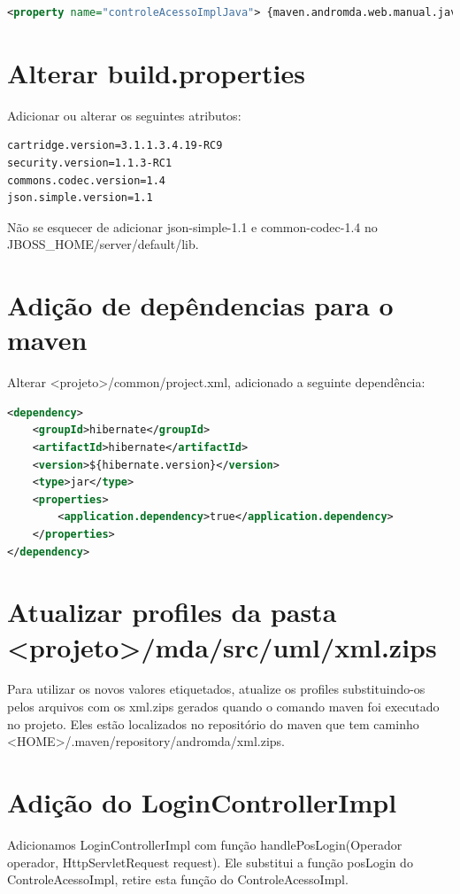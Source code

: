 \begin{framed}
\begin{lstlisting}[language=xml]
<property name="controleAcessoImplJava"> {maven.andromda.web.manual.java.dir}</property>
\end{lstlisting}
\end{framed}

\section{Alterar build.properties}
Adicionar ou alterar os seguintes atributos:

\begin{framed}
\begin{lstlisting}[language=xml]
cartridge.version=3.1.1.3.4.19-RC9
security.version=1.1.3-RC1
commons.codec.version=1.4
json.simple.version=1.1
\end{lstlisting}
\end{framed}

Não se esquecer de adicionar json-simple-1.1 e common-codec-1.4 no
\textdollar{}JBOSS\_HOME/server/default/lib.

\section{Adição de depêndencias para o maven}
Alterar <projeto>/common/project.xml, adicionado a seguinte dependência:

\begin{framed}
\begin{lstlisting}[language=xml]
<dependency>
	<groupId>hibernate</groupId>
	<artifactId>hibernate</artifactId>
	<version>${hibernate.version}</version>
	<type>jar</type>
	<properties>
		<application.dependency>true</application.dependency>
	</properties>
</dependency>
\end{lstlisting}
\end{framed}

\section{Atualizar profiles da pasta <projeto>/mda/src/uml/xml.zips}
Para utilizar os novos valores etiquetados, atualize os profiles substituindo-os
pelos arquivos com os xml.zips gerados quando o comando maven foi executado no projeto. Eles estão localizados no repositório do maven que tem caminho <HOME>/.maven/repository/andromda/xml.zips.

\section{Adição do LoginControllerImpl}
Adicionamos LoginControllerImpl com função handlePosLogin(Operador operador,
HttpServletRequest request). Ele substitui a função posLogin do ControleAcessoImpl, retire esta função do ControleAcessoImpl.

